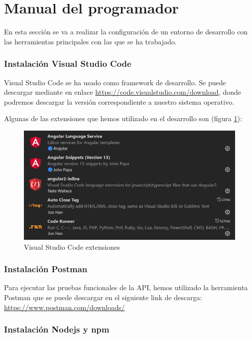 \section{Manual del programador}

En esta sección se va a realizar la configuración de un entorno de desarrollo con las herramientas principales con las que se ha trabajado.

\subsubsection{Instalación Visual Studio Code}

Visual Studio Code se ha usado como framework de desarrollo. Se puede descargar mediante en enlace \url{https://code.visualstudio.com/download}, donde podremos descargar la versión correspondiente a nuestro sistema operativo.

Algunas de las extensiones que hemos utilizado en el desarrollo son (figura \ref{fig:visualstudio_extensions}):

\begin{figure}[h!] 
\centering
    \includegraphics[width=1\textwidth]{img/visualcode_extensiones.PNG}
\caption{Visual Studio Code extensiones}
\label{fig:visualstudio_extensions}
\end{figure}

\subsubsection{Instalación Postman}

Para ejecutar las pruebas funcionales de la API, hemos utilizado la herramienta Postman que se puede descargar en el siguiente link de descarga: \url{https://www.postman.com/downloads/}

\subsubsection{Instalación Nodejs y npm}

